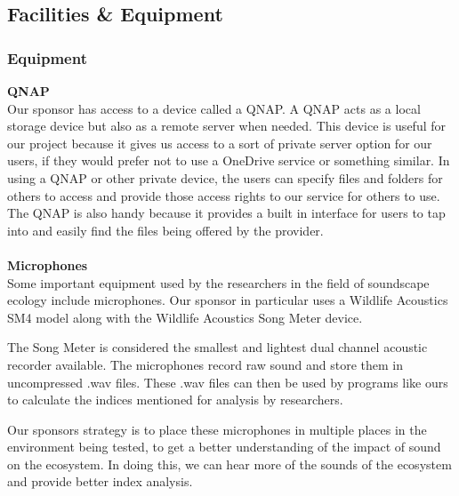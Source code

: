 \subsection{Facilities \& Equipment}
\subsubsection{Equipment}
\textbf{QNAP}\\
Our sponsor has access to a device called a QNAP. A QNAP acts as a local storage device but also as a remote server when needed. This device is useful for our project because it gives us access to a sort of private server option for our users, if they would prefer not to use a OneDrive service or something similar. In using a QNAP or other private device, the users can specify files and folders for others to access and provide those access rights to our service for others to use. The QNAP is also handy because it provides a built in interface for users to tap into and easily find the files being offered by the provider.\\\\
\textbf{Microphones}\\
Some important equipment used by the researchers in the field of soundscape ecology include microphones. Our sponsor in particular uses a Wildlife Acoustics SM4 model along with the Wildlife Acoustics Song Meter device.\par
The Song Meter is considered the smallest and lightest dual channel acoustic recorder available\cite{songmeter}. The microphones record raw sound and store them in uncompressed .wav files. These .wav files can then be used by programs like ours to calculate the indices mentioned for analysis by researchers.\par
Our sponsor\textquotesingle s strategy is to place these microphones in multiple places in the environment being tested, to get a better understanding of the impact of sound on the ecosystem. In doing this, we can hear more of the sounds of the ecosystem and provide better index analysis.\par

